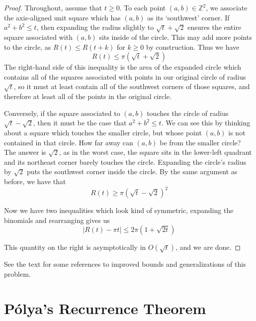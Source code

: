 \begin{proof}
	
	Throughout, assume that $t\geq 0$.  To each point $(a,b)\in\mathbb{Z}^2$, we associate the axis-aligned unit square which has $(a,b)$ as its `southwest' corner.  If $a^2+b^2\leq t$, then expanding the radius slightly to $\sqrt{t}+\sqrt{2}$ ensures the entire square associated with $(a,b)$ sits inside of the circle.  This may add more points to the circle, as $R(t)\leq R(t+k)$ for $k\geq 0$ by construction.  Thus we have $$R(t)\leq \pi(\sqrt{t}+\sqrt{2})$$  The right-hand side of this inequality is the area of the expanded circle which contains all of the squares associated with points in our original circle of radius $\sqrt{t}$, so it must at least contain all of the southwest corners of those squares, and therefore at least all of the points in the original circle.
	
	Conversely, if the square associated to $(a,b)$ touches the circle of radius $\sqrt{t}-\sqrt{2}$, then it must be the case that $a^2+b^2\leq t$.  We can see this by thinking about a square which touches the smaller circle, but whose point $(a,b)$ is not contained in that circle.  How far away can $(a,b)$ be from the smaller circle?  The answer is $\sqrt{2}$, as in the worst case, the square sits in the lower-left quadrant and its northeast corner barely touches the circle.  Expanding the circle's radius by $\sqrt{2}$ puts the southwest corner inside the circle.  By the same argument as before, we have that $$R(t)\geq \pi(\sqrt{t}-\sqrt{2})^2$$
	
	Now we have two inequalities which look kind of symmetric, expanding the binomials and rearranging gives us 
	$$|R(t)-\pi t|\leq 2\pi(1+\sqrt{2t})$$
	
	This quantity on the right is asymptotically in $O(\sqrt{t})$, and we are done.
	
	
	
\end{proof}


See the text for some references to improved bounds and generalizations of this problem.

\section*{P\'olya's Recurrence Theorem}





